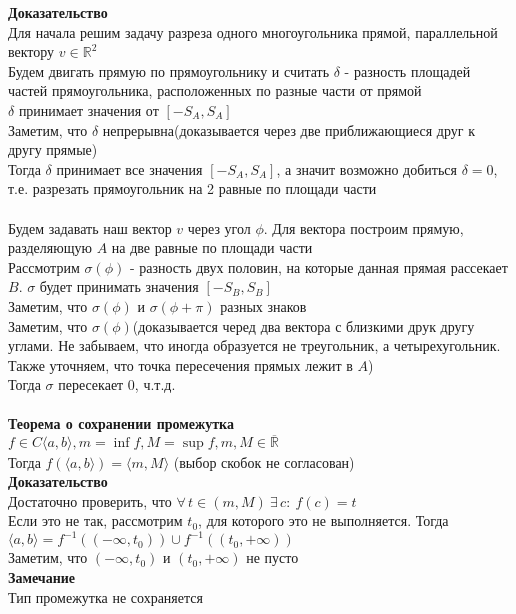 \documentclass[12pt]{article}
\begin{document}
\textbf{Доказательство}\\
Для начала решим задачу разреза одного многоугольника прямой, параллельной вектору $v\in \mathbb{R}^2$\\
Будем двигать прямую по прямоугольнику и считать $\delta$ - разность площадей частей прямоугольника, расположенных по разные части от прямой\\
$\delta$ принимает значения от $[-S_A, S_A]$\\
Заметим, что $\delta$ непрерывна(доказывается через две приближающиеся друг к другу прямые)\\
Тогда $\delta$ принимает все значения $[-S_A, S_A]$, а значит возможно добиться $\delta = 0$, т.е. разрезать прямоугольник на 2 равные по площади части\\\\
Будем задавать наш вектор $v$ через угол $\phi$. Для вектора построим прямую, разделяющую $A$ на две равные по площади части\\
Рассмотрим $\sigma(\phi)$ - разность двух половин, на которые данная прямая рассекает $B$. $\sigma$ будет принимать значения $[-S_B, S_B]$\\
Заметим, что $\sigma(\phi)$ и $\sigma(\phi + \pi)$ разных знаков\\
Заметим, что $\sigma(\phi)$(доказывается черед два вектора с близкими друк другу углами. Не забываем, что иногда образуется не треугольник, а четырехугольник. Также уточняем, что точка пересечения прямых лежит в $A$)\\
Тогда $\sigma$ пересекает 0, ч.т.д.\\\\
\textbf{Теорема о сохранении промежутка}\\
$f\in C\langle a,b\rangle, m = \inf f, M = \sup\limits_{} f, m,M \in \overline{\mathbb{R}}$\\
Тогда $f(\langle a,b\rangle) = \langle m, M\rangle$ (выбор скобок не согласован)\\
\textbf{Доказательство}\\
Достаточно проверить, что $\forall\,t\in (m,M)\ \exists\,c:\ f(c) = t$\\
Если это не так, рассмотрим $t_0$, для которого это не выполняется. Тогда $\langle a, b \rangle = f^{-1}((-\infty, t_0))\cup f^{-1}((t_0, +\infty))$\\
Заметим, что $(-\infty, t_0)$ и $(t_0, +\infty)$ не пусто\\
\textbf{Замечание}\\
Тип промежутка не сохраняется\\
\end{document}
